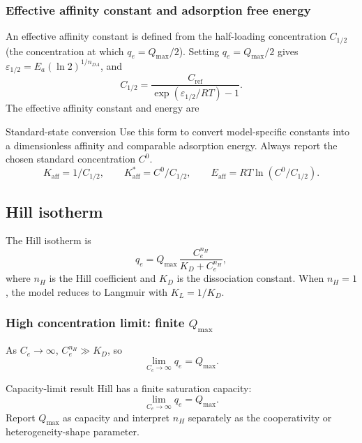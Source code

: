 \documentclass[journal=jacsat,manuscript=article]{achemso}
\begin{document}
\subsubsection{Effective affinity constant and adsorption free energy}

An effective affinity constant is defined from the half-loading concentration $C_{1/2}$
(the concentration at which $q_e = Q_{\max}/2$).
Setting $q_e = Q_{\max}/2$ gives $\varepsilon_{1/2} = E_a(\ln 2)^{1/n_{DA}}$, and
\begin{equation}
	C_{1/2} = \frac{C_{\mathrm{ref}}}{\exp(\varepsilon_{1/2}/RT) - 1}.
\end{equation}
The effective affinity constant and energy are
\begin{greenbox}{Standard-state conversion}
	Use this form to convert model-specific constants into a dimensionless affinity and comparable adsorption energy. Always report the chosen standard concentration \(C^0\).
\begin{equation}
	K_{\mathrm{aff}} = 1/C_{1/2},
		\qquad
		K_{\mathrm{aff}}^{\ast} = C^0/C_{1/2},
		\qquad
		E_{\mathrm{aff}} = RT\ln(C^0/C_{1/2}).
\end{equation}
\end{greenbox}

\subsection{Hill isotherm}
\label{sec:si_hill}

The Hill isotherm is
\begin{equation}
	q_e = Q_{\max}\,\frac{C_e^{n_H}}{K_D + C_e^{n_H}},
	\label{eq:si_hill}
\end{equation}
where $n_H$ is the Hill coefficient and $K_D$ is the dissociation constant.
When $n_H = 1$, the model reduces to Langmuir with $K_L = 1/K_D$.

\subsubsection{High concentration limit: finite $Q_{\max}$}

As $C_e \to \infty$, $C_e^{n_H} \gg K_D$, so
\begin{equation}
	\lim_{C_e \to \infty} q_e = Q_{\max}.
\end{equation}
\begin{greenbox}{Capacity-limit result}
	Hill has a finite saturation capacity:
	\begin{equation}
		\lim_{C_e \to \infty} q_e = Q_{\max}.
	\end{equation}
	Report \(Q_{\max}\) as capacity and interpret \(n_H\) separately as the
	cooperativity or heterogeneity-shape parameter.
\end{greenbox}
\end{document}

